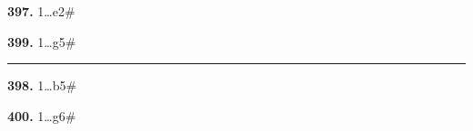 \documentclass[12pt,twoside]{article}
\begin{document}
{\footnotesize\sloppy
\noindent
\begin{minipage}[t]{\textwidth}
    \begin{minipage}[c]{0.47\textwidth}
{\bfseries 397.} 1\ldots \symrook{}e2\#
        \vspace{0.45em}

{\bfseries 399.} 1\ldots \symking{}g5\#    \end{minipage}
        \hfill
    \begin{minipage}[c][4.9\baselineskip][c]{0.02\textwidth}
        \centering\rule{0.4pt}{4.7\baselineskip}
    \end{minipage}
    \hfill
    \begin{minipage}[c]{0.47\textwidth}
{\bfseries 398.} 1\ldots \symrook{}b5\#
        \vspace{0.45em}

{\bfseries 400.} 1\ldots \symking{}g6\#    \end{minipage}
\end{minipage}
}
\end{document}
